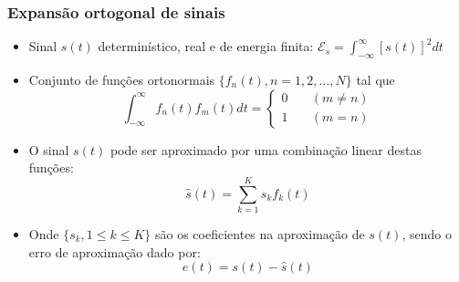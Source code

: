 \begin{frame}
	\frametitle{Expansão ortogonal de sinais}

	\begin{itemize}
		\item Sinal $s(t)$ determinístico, real e de energia finita: $\mathcal{E}_s = \int_{-\infty}^{\infty}[s(t)]^2 dt$
		\item Conjunto de funções ortonormais $\{ f_n(t), n=1, 2, \ldots, N\}$ tal que
		\begin{equation*}
			\int_{-\infty}^{\infty} f_n(t)f_m(t) dt = \begin{cases}
									0 &\quad (m\neq n) \\
									1 &\quad (m=n)
			                                          \end{cases}
		\end{equation*}
		\item O sinal $s(t)$ pode ser aproximado por uma combinação linear destas funções:
		\begin{equation*}
			\hat{s}(t) = \sum_{k=1}^{K} s_k f_k(t)
		\end{equation*}
		\item Onde $\{s_k, 1\leq k \leq K\}$ são os coeficientes na aproximação de $s(t)$, sendo o erro de aproximação dado por:
		\begin{equation*}
			e(t) = s(t) - \hat{s}(t)
		\end{equation*}
	\end{itemize}

\end{frame}

